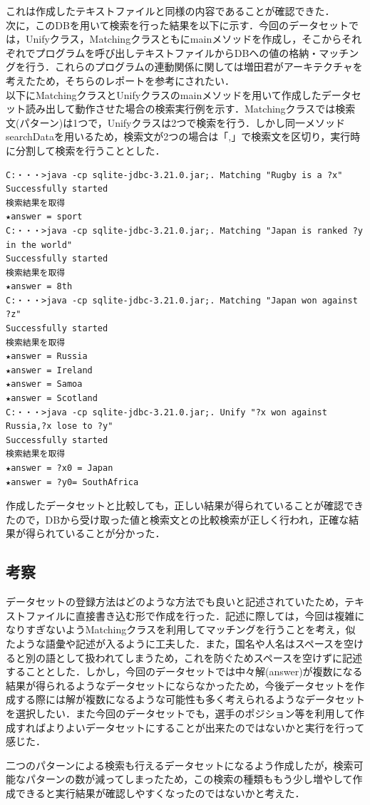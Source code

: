 \documentclass[12pt]{jarticle}
\begin{document}
これは作成したテキストファイルと同様の内容であることが確認できた．\\

次に，このDBを用いて検索を行った結果を以下に示す．今回のデータセットでは，Unifyクラス，Matchingクラスともにmainメソッドを作成し，そこからそれぞれでプログラムを呼び出しテキストファイルからDBへの値の格納・マッチングを行う．これらのプログラムの連動関係に関しては増田君がアーキテクチャを考えたため，そちらのレポートを参考にされたい．\\

以下にMatchingクラスとUnifyクラスのmainメソッドを用いて作成したデータセット読み出して動作させた場合の検索実行例を示す．Matchingクラスでは検索文(パターン)は1つで，Unifyクラスは2つで検索を行う．しかし同一メソッドsearchDataを用いるため，検索文が2つの場合は「,」で検索文を区切り，実行時に分割して検索を行うこととした．\\

\begin{lstlisting}
C:・・・>java -cp sqlite-jdbc-3.21.0.jar;. Matching "Rugby is a ?x"
Successfully started
検索結果を取得
★answer = sport
C:・・・>java -cp sqlite-jdbc-3.21.0.jar;. Matching "Japan is ranked ?y in the world"
Successfully started
検索結果を取得
★answer = 8th
C:・・・>java -cp sqlite-jdbc-3.21.0.jar;. Matching "Japan won against ?z"
Successfully started
検索結果を取得
★answer = Russia
★answer = Ireland
★answer = Samoa
★answer = Scotland
C:・・・>java -cp sqlite-jdbc-3.21.0.jar;. Unify "?x won against Russia,?x lose to ?y"
Successfully started
検索結果を取得
★answer = ?x0 = Japan
★answer = ?y0= SouthAfrica
\end{lstlisting}

作成したデータセットと比較しても，正しい結果が得られていることが確認できたので，DBから受け取った値と検索文との比較検索が正しく行われ，正確な結果が得られていることが分かった．

\subsection{考察}
データセットの登録方法はどのような方法でも良いと記述されていたため，テキストファイルに直接書き込む形で作成を行った．記述に際しては，今回は複雑になりすぎないようMatchingクラスを利用してマッチングを行うことを考え，似たような語彙や記述が入るように工夫した．また，国名や人名はスペースを空けると別の語として扱われてしまうため，これを防ぐためスペースを空けずに記述することとした．しかし，今回のデータセットでは中々解(answer)が複数になる結果が得られるようなデータセットにならなかったため，今後データセットを作成する際には解が複数になるような可能性も多く考えられるようなデータセットを選択したい．また今回のデータセットでも，選手のポジション等を利用して作成すればよりよいデータセットにすることが出来たのではないかと実行を行って感じた．\par
二つのパターンによる検索も行えるデータセットになるよう作成したが，検索可能なパターンの数が減ってしまったため，この検索の種類ももう少し増やして作成できると実行結果が確認しやすくなったのではないかと考えた．\\
\end{document}
